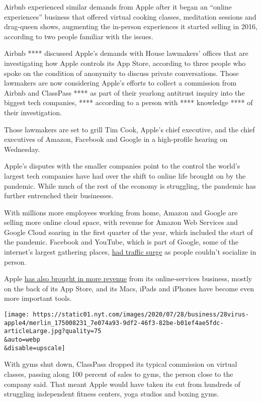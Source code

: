 Airbnb experienced similar demands from Apple after it began an ``online
experiences'' business that offered virtual cooking classes, meditation
sessions and drag-queen shows, augmenting the in-person experiences it
started selling in 2016, according to two people familiar with the
issues.

Airbnb **** discussed Apple's demands with House lawmakers' offices that
are investigating how Apple controls its App Store, according to three
people who spoke on the condition of anonymity to discuss private
conversations. Those lawmakers are now considering Apple's efforts to
collect a commission from Airbnb and ClassPass **** as part of their
yearlong antitrust inquiry into the biggest tech companies, ****
according to a person with **** knowledge **** of their investigation.

Those lawmakers are set to grill Tim Cook, Apple's chief executive, and
the chief executives of Amazon, Facebook and Google in a high-profile
hearing on Wednesday.

Apple's disputes with the smaller companies point to the control the
world's largest tech companies have had over the shift to online life
brought on by the pandemic. While much of the rest of the economy is
struggling, the pandemic has further entrenched their businesses.

With millions more employees working from home, Amazon and Google are
selling more online cloud space, with revenue for Amazon Web Services
and Google Cloud soaring in the first quarter of the year, which
included the start of the pandemic. Facebook and YouTube, which is part
of Google, some of the internet's largest gathering places,
\href{https://www.nytimes.com/interactive/2020/04/07/technology/coronavirus-internet-use.html}{had
traffic surge} as people couldn't socialize in person.

Apple
\href{https://www.nytimes.com/2020/04/30/technology/apple-sales-earnings-coronavirus.html}{has
also brought in more revenue} from its online-services business, mostly
on the back of its App Store, and its Macs, iPads and iPhones have
become even more important tools.

\texttt{[image: https://static01.nyt.com/images/2020/07/28/business/28virus-apple4/merlin\_175008231\_7e074a93-9df2-46f3-82be-b01ef4ae5fdc-articleLarge.jpg?quality=75\\\&auto=webp\\\&disable=upscale]}

With gyms shut down, ClassPass dropped its typical commission on virtual
classes, passing along 100 percent of sales to gyms, the person close to
the company said. That meant Apple would have taken its cut from
hundreds of struggling independent fitness centers, yoga studios and
boxing gyms.

